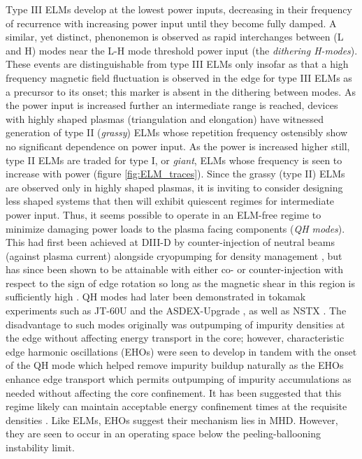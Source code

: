 \documentclass[11pt,titlepage]{report}
\begin{document}
Type III ELMs develop at the lowest power inputs, decreasing in their frequency of recurrence with increasing power input until they become fully damped. A similar, yet distinct, phenonemon is observed as rapid interchanges between (L and H) modes near the L-H mode threshold power input (the \emph{dithering H-modes}). These events are distinguishable from type III ELMs only insofar as that a high frequency magnetic field fluctuation is observed in the edge for type III ELMs as a precursor to its onset; this marker is absent in the dithering between modes. As the power input is increased further an intermediate range is reached, devices with highly shaped plasmas (triangulation and elongation) have witnessed generation of type II (\emph{grassy}) ELMs whose repetition frequency ostensibly show no significant dependence on power input. As the power is increased higher still, type II ELMs are traded for type I, or \emph{giant}, ELMs whose frequency is seen to increase with power (figure \ref{fig:ELM_traces}). Since the grassy (type II) ELMs are observed only in highly shaped plasmas, it is inviting to consider designing less shaped systems that then will exhibit quiescent regimes for intermediate power input. Thus, it seems possible to operate in an ELM-free regime to minimize damaging power loads to the plasma facing components (\emph{QH modes}). This had first been achieved at DIII-D by counter-injection of neutral beams (against plasma current) alongside cryopumping for density management \cite{Burrell02, Burrell09}, but has since been shown to be attainable with either co- or counter-injection with respect to the sign of edge rotation so long as the magnetic shear in this region is sufficiently high \cite{Burrell01, Burrell09}. QH modes had later been demonstrated in tokamak experiments such as JT-60U and the ASDEX-Upgrade \cite{Suttrop04}, as well as NSTX \cite{Park}. The disadvantage to such modes originally was outpumping of impurity densities at the edge without affecting energy transport in the core; however, characteristic edge harmonic oscillations (EHOs) were seen to develop in tandem with the onset of the QH mode which helped remove impurity buildup naturally as the EHOs enhance edge transport which permits outpumping of impurity accumulations as needed without affecting the core confinement. It has been suggested that this regime likely can maintain acceptable energy confinement times at the requisite densities \cite{Loarte03}. Like ELMs, EHOs suggest their mechanism lies in MHD. However, they are seen to occur in an operating space below the peeling-ballooning instability limit. 
\end{document}
